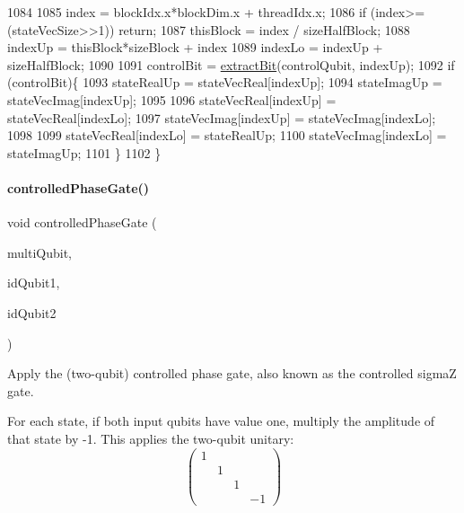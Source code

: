 \begin{DoxyCode}
1084 
1085     index = blockIdx.x*blockDim.x + threadIdx.x;
1086     \textcolor{keywordflow}{if} (index>=(stateVecSize>>1)) \textcolor{keywordflow}{return};
1087     thisBlock   = index / sizeHalfBlock;
1088     indexUp     = thisBlock*sizeBlock + index%
1089     indexLo     = indexUp + sizeHalfBlock;
1090 
1091     controlBit = \mbox{\hyperlink{QuEST__env__localGPU_8cu_a6ffa51987d8ad8f6c0fc07fd3492277f}{extractBit}}(controlQubit, indexUp);
1092     \textcolor{keywordflow}{if} (controlBit)\{
1093         stateRealUp = stateVecReal[indexUp];
1094         stateImagUp = stateVecImag[indexUp];
1095 
1096         stateVecReal[indexUp] = stateVecReal[indexLo];
1097         stateVecImag[indexUp] = stateVecImag[indexLo];
1098 
1099         stateVecReal[indexLo] = stateRealUp;
1100         stateVecImag[indexLo] = stateImagUp;
1101     \}
1102 \}
\end{DoxyCode}
\mbox{\label{QuEST__env__localGPU_8cu_a11a96159191cbf1b01a1080e7f045aac}} 
\paragraph{\texorpdfstring{controlled\+Phase\+Gate()}{controlledPhaseGate()}}
{\footnotesize\ttfamily void controlled\+Phase\+Gate (\begin{DoxyParamCaption}\item[{\mbox{\hyperlink{structMultiQubit}{Multi\+Qubit}}}]{multi\+Qubit,  }\item[{const int}]{id\+Qubit1,  }\item[{const int}]{id\+Qubit2 }\end{DoxyParamCaption})}



Apply the (two-\/qubit) controlled phase gate, also known as the controlled sigmaZ gate. 

For each state, if both input qubits have value one, multiply the amplitude of that state by -\/1. This applies the two-\/qubit unitary\+: \[ \begin{pmatrix} 1 \\ & 1 \\\ & & 1 \\ & & & -1 \end{pmatrix} \]

